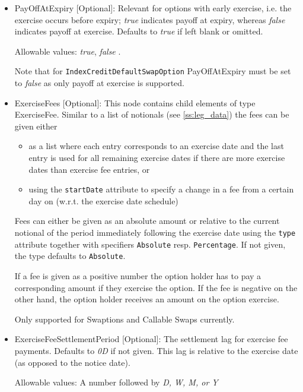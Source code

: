 \begin{itemize}
\item PayOffAtExpiry [Optional]: Relevant for options with early
  exercise, i.e. the exercise occurs before expiry; \emph{true}
  indicates payoff at expiry, whereas \emph{false}  indicates payoff
  at exercise. Defaults to \emph{true}  if left blank or omitted. 

Allowable values: \emph{true}, \emph{false} .

Note that for \lstinline!IndexCreditDefaultSwapOption! PayOffAtExpiry must be set to \emph{false} as only payoff at exercise is supported.


\item ExerciseFees [Optional]: This node contains child elements of type ExerciseFee. Similar to a list of notionals
  (see \ref{ss:leg_data}) the fees can be given either

  \begin{itemize}
  \item as a list where each entry corresponds to an exercise date and the last entry is used for all remaining exercise
    dates if there are more exercise dates than exercise fee entries, or
  \item using the \verb+startDate+ attribute to specify a change in a fee from a certain day on (w.r.t. the exercise
    date schedule)
  \end{itemize}

  Fees can either be given as an absolute amount or relative to the current notional of the period immediately following
  the exercise date using the \verb+type+ attribute together with specifiers \verb+Absolute+ resp. \verb+Percentage+. If
  not given, the type defaults to \verb+Absolute+.

  If a fee is given as a positive number the option holder has to pay a corresponding amount if they exercise the
  option. If the fee is negative on the other hand, the option holder receives an amount on the option exercise.

  Only supported for Swaptions and Callable Swaps currently.

\item ExerciseFeeSettlementPeriod [Optional]: The settlement lag for exercise fee payments. Defaults to \emph{0D} if not
  given. This lag is relative to the exercise date (as opposed to the notice date).
  
  Allowable values: A number followed by \emph{D, W, M, or Y}


\end{itemize}
